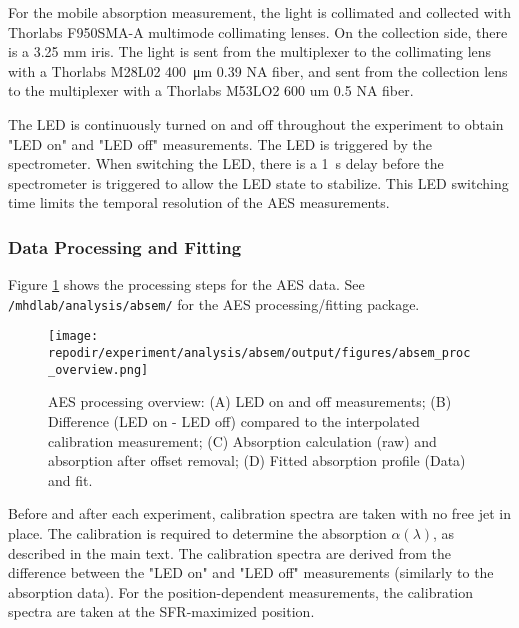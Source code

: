 For the mobile absorption measurement, the light is collimated and collected with Thorlabs F950SMA-A multimode collimating lenses. On the collection side, there is a 3.25  mm iris. The light is sent from the multiplexer to the collimating lens with a Thorlabs M28L02 \SI{400} {\micro\meter} 0.39 NA fiber, and sent from the collection lens to the multiplexer with a Thorlabs M53LO2 600 um 0.5 NA fiber. 

The LED is continuously turned on and off throughout the experiment to obtain "LED on" and "LED off" measurements. The LED is triggered by the spectrometer. When switching the LED, there is a \SI{1} {\second} delay before the spectrometer is triggered to allow the LED state to stabilize. This LED switching time limits the temporal resolution of the AES measurements. 

\subsubsection{Data Processing and Fitting}

Figure \ref{fig:SI_AES_proc_overview} shows the processing steps for the AES data.
See \texttt{/mhdlab/analysis/absem/} for the AES processing/fitting package. 


\begin{figure}[]
    \centering
    \texttt{[image: \\repodir/experiment/analysis/absem/output/figures/absem\_proc\_overview.png]}
    \caption{AES processing overview: (A) LED on and off measurements; (B) Difference (LED on - LED off) compared to the interpolated calibration measurement; (C) Absorption calculation (raw) and absorption after offset removal; (D) Fitted absorption profile (Data) and fit.}
    \label{fig:SI_AES_proc_overview}
\end{figure}


Before and after each experiment, calibration spectra are taken with no free jet in place. The calibration is required to determine the absorption $\alpha(\lambda)$, as described in the main text.  The calibration spectra are derived from the difference between the "LED on" and "LED off" measurements (similarly to the absorption data). For the position-dependent measurements, the calibration spectra are taken at the SFR-maximized position. 


